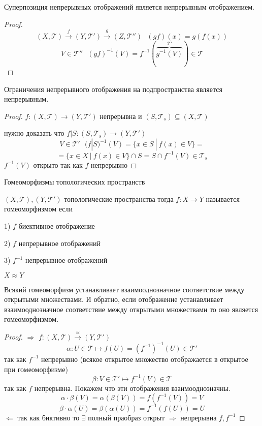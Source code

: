 \begin{theorem}
  Суперпозиция непрерывных отображений является непрерывным отображением.
\end{theorem}

\begin{proof}
  $$
  (X, \mathcal{T}) \stackrel{f}{\to} (Y, \mathcal{T}') \stackrel{g}{\to}
  (Z, \mathcal{T}'') ~~~ (gf)(x) = g(f(x))
  $$
  $$
  V \in \mathcal{T}'' ~~~ (gf)^{-1}(V) =
  f^{-1}(\overbrace{g^{-1}(V)}^{\mathcal{T}'}) \in \mathcal{T}
  $$
\end{proof}

\begin{theorem}
  Ограничения непрерывного отображения на подпространства является непрерывным.
\end{theorem}

\begin{proof}
  $f: (X, \mathcal{T}) \to (Y, \mathcal{T}')$ непрерывна и $(S, \mathcal{T}_s)
  \subseteq (X, \mathcal{T})$

  нужно доказать что $f|S : (S, \mathcal{T}_s) \to (Y, \mathcal{T}')$
  $$
  V \in \mathcal{T}' ~~~ (f | S)^{-1}(V) = \{ x \in S ~ | ~ f(x) \in V \} =
  $$
  $$
  = \{x \in X ~ | ~ f(x) \in V\} \cap S = S \cap f^{-1}(V) \in \mathcal{T}_s
  $$
  $f^{-1}(V)$ открыто так как $f$ непрерывно
\end{proof}

\begin{title}[\Large]
  Гомеоморфизмы топологических пространств
\end{title}

\begin{define}[гомеоморфизма]
  $(X, \mathcal{T}), (Y, \mathcal{T}')$ топологические пространства тогда
  $f: X \to Y$ называется гомеоморфизмом если

  1) $f$ биективное отображение

  2) $f$ непрерывное отображений

  3) $f^{-1}$ непрерывное отображений

  $X \approx Y$
\end{define}

\begin{theorem}
  Всякий гомеоморфизм устанавливает взаимооднозначное соответствие между
  открытыми множествами. И обратно, если отображение устанавливает
  взаимооднозначное соответствие между открытыми множествами то оно является
  гомеоморфизмом.
\end{theorem}

\begin{proof}
  $\Rightarrow$ $f:(X, \mathcal{T}) \stackrel{\approx}{\to} (Y, \mathcal{T}')$
  $$
  \alpha : U \in \mathcal{T} \mapsto f(U) = (f^{-1})^{-1}(U) \in \mathcal{T}'
  $$
  так как $f^{-1}$ непрерывно (всякое открытое множество отображается в открытое
  при гомеоморфизме)
  $$
  \beta : V \in \mathcal{T}' \mapsto f^{-1}(V) \in \mathcal{T}
  $$
  так как $f$ непрерывна. Покажем что эти отображения взаимооднозначны.
  $$
  \alpha \cdot \beta (V) = \alpha(\beta(V)) = f(f^{-1}(V)) = V
  $$
  $$
  \beta \cdot \alpha (U) = \beta(\alpha(U)) = f^{-1}(f(U)) = U
  $$
  $\Leftarrow$ так как биктивно то $\exists$ полный праобраз открыт
  $\Rightarrow$ непрерывна $f, f^{-1}$
\end{proof}